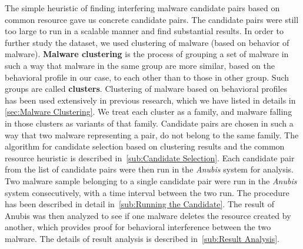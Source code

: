 The simple heuristic of finding interfering malware candidate pairs based on common resource gave us concrete candidate pairs.  The candidate pairs were still too large to run in a scalable manner and find substantial results.
In order to further study the dataset, we used clustering of malware (based on behavior of malware).
\textbf{Malware clustering} is the process of grouping a set of malware in such a way that malware in the same group are more similar, based on the behavioral profile in our case, to each other than to those in other group.
Such groups are called \textbf{clusters}.
Clustering of malware based on behavioral profiles has been used extensively in previous research, which we have listed in details in \autoref{sec:Malware Clustering}.
We treat each cluster as a family, and malware falling in those clusters as variants of that family.
Candidate pairs are chosen in such a way that two malware representing a pair, do not belong to the same family.
The algorithm for candidate selection based on clustering results and the common resource heuristic is described in~\autoref{sub:Candidate Selection}.
Each candidate pair from the list of candidate pairs were then run in the \emph{Anubis} system for analysis.\\
Two malware sample belonging to a single candidate pair were run in the \emph{Anubis} system consecutively, with a time interval between the two run.
The procedure has been described in detail in~\autoref{sub:Running the Candidate}.
The result of Anubis was then analyzed to see if one malware deletes the resource created by another, which provides proof for behavioral interference between the two malware.
The details of result analysis is described in~\autoref{sub:Result Analysis}.\\
